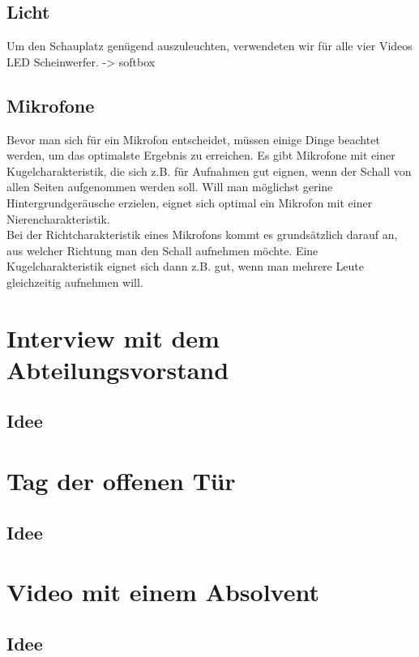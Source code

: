 \subsection{Licht}
Um den Schauplatz genügend auszuleuchten, verwendeten wir für alle vier Videos LED Scheinwerfer. -> softbox 

\subsection{Mikrofone}
Bevor man sich für ein Mikrofon entscheidet, müssen einige Dinge beachtet werden, um das optimalste Ergebnis zu erreichen. Es gibt Mikrofone mit einer Kugelcharakteristik, die sich z.B. für Aufnahmen gut eignen, wenn der Schall von allen Seiten aufgenommen werden soll. Will man möglichst gerine Hintergrundgeräusche erzielen, eignet sich optimal ein Mikrofon mit einer Nierencharakteristik. \\
Bei der Richtcharakteristik eines Mikrofons kommt es grundsätzlich darauf an, aus welcher Richtung man den Schall aufnehmen möchte. Eine Kugelcharakteristik eignet sich dann z.B. gut, wenn man mehrere Leute gleichzeitig aufnehmen will. \\

\section{Interview mit dem Abteilungsvorstand}
\renewcommand{\kapitelautor}{Autor: Kerstin Schön}
\subsection{Idee}
\renewcommand{\kapitelautor}{Autor: Kerstin Schön}
\section{Tag der offenen Tür}
\renewcommand{\kapitelautor}{Autor: Kerstin Schön}
\subsection{Idee}
\renewcommand{\kapitelautor}{Autor: Kerstin Schön}
\section{Video mit einem Absolvent}
\renewcommand{\kapitelautor}{Autor: Kerstin Schön}
\subsection{Idee}
\renewcommand{\kapitelautor}{Autor: Kerstin Schön}

